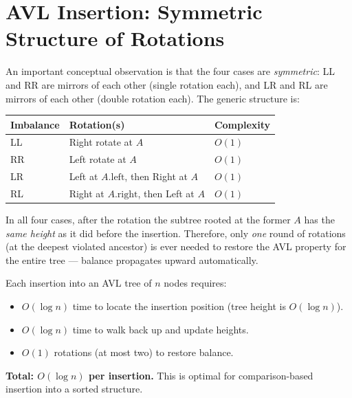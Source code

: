 \documentclass[11pt, a4paper, notitlepage]{report}
\theoremstyle{definition}
\theoremstyle{remark}
\theoremstyle{definition}
\begin{document}
\section{AVL Insertion: Symmetric Structure of Rotations}
\label{sec:avl-symmetry}

An important conceptual observation is that the four cases are \emph{symmetric}: LL and RR
are mirrors of each other (single rotation each), and LR and RL are mirrors of each other
(double rotation each).  The generic structure is:

\begin{center}
\begin{tabular}{@{}lll@{}}
\toprule
\textbf{Imbalance} & \textbf{Rotation(s)} & \textbf{Complexity} \\
\midrule
LL & Right rotate at $A$ & $O(1)$ \\
RR & Left rotate at $A$ & $O(1)$ \\
LR & Left at $A.\text{left}$, then Right at $A$ & $O(1)$ \\
RL & Right at $A.\text{right}$, then Left at $A$ & $O(1)$ \\
\bottomrule
\end{tabular}
\end{center}

In all four cases, after the rotation the subtree rooted at the former $A$ has the
\emph{same height} as it did before the insertion.  Therefore, only \emph{one} round of
rotations (at the deepest violated ancestor) is ever needed to restore the AVL property
for the entire tree --- balance propagates upward automatically.

\begin{keyresult}[title={Key Result: AVL Insertion Complexity}]
Each insertion into an AVL tree of $n$ nodes requires:
\begin{itemize}
  \item $O(\log n)$ time to locate the insertion position (tree height is $O(\log n)$).
  \item $O(\log n)$ time to walk back up and update heights.
  \item $O(1)$ rotations (at most two) to restore balance.
\end{itemize}
\textbf{Total: $O(\log n)$ per insertion.}  This is optimal for comparison-based insertion
into a sorted structure.
\end{keyresult}

\end{document}
